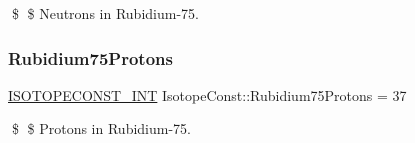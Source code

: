 \$ \$ Neutrons in Rubidium-\/75. \mbox{\label{group___isotope_const-_rubidium-_rb75_ga1af95af02ed1ce58e0c383bc6687ed6f}} 
\subsubsection{\texorpdfstring{Rubidium75\+Protons}{Rubidium75Protons}}
{\footnotesize\ttfamily \mbox{\hyperlink{group___isotope_const-_macros_ga5f18360b3e99483a35c32d789e62621c}{I\+S\+O\+T\+O\+P\+E\+C\+O\+N\+S\+T\+\_\+\+I\+NT}} Isotope\+Const\+::\+Rubidium75\+Protons = 37}

\$ \$ Protons in Rubidium-\/75. 